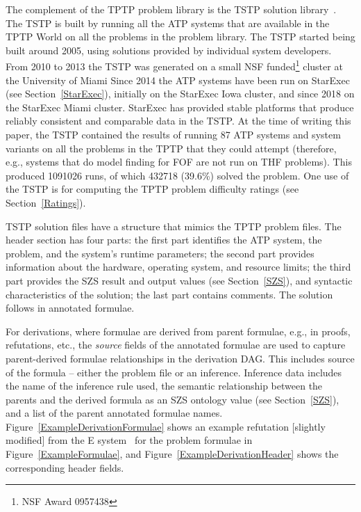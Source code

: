 \documentclass{easychair}
\begin{document}
The complement of the TPTP problem library is the TSTP solution library~\cite{Sut07-CSR,Sut10}.
The TSTP is built by running all the ATP systems that are available in the TPTP World on
all the problems in the problem library.
The TSTP started being built around 2005, using solutions provided by individual system developers.
From 2010 to 2013 the TSTP was generated on a small NSF funded\footnote{%
NSF Award 0957438} cluster at the University of Miami
Since 2014 the ATP systems have been run on StarExec (see Section~\ref{StarExec}), initially on 
the StarExec Iowa cluster, and since 2018 on the StarExec Miami cluster.
StarExec has provided stable platforms that produce reliably consistent and comparable data in 
the TSTP.
At the time of writing this paper, the TSTP contained the results of running 87 ATP systems and 
system variants on all the problems in the TPTP that they could attempt
(therefore, e.g., systems that do model finding for FOF are not run on THF problems).
This produced 1091026 runs, of which 432718 (39.6\%) solved the problem.
One use of the TSTP is for computing the TPTP problem difficulty ratings (see 
Section~\ref{Ratings}).

TSTP solution files have a structure that mimics the TPTP problem files.
The header section has four parts: 
the first part identifies the ATP system, the problem, and the system's runtime parameters; 
the second part provides information about the hardware, operating system, and resource limits; 
the third part provides the SZS result and output values (see Section~\ref{SZS}), and syntactic 
characteristics of the solution; the last part contains comments.
The solution follows in annotated formulae. 

For derivations, where formulae are derived from parent formulae, e.g., in proofs, refutations, 
etc., the {\em source} fields of the annotated formulae are used to capture parent-derived 
formulae relationships in the derivation DAG.
This includes source of the formula -- either the problem file or an inference.
Inference data includes the name of the inference rule used, the semantic relationship between 
the parents and the derived formula as an SZS ontology value (see Section~\ref{SZS}), and a 
list of the parent annotated formulae names.
Figure~\ref{ExampleDerivationFormulae} shows an example refutation [slightly modified] from the 
E system~\cite{SCV19} for the problem formulae in Figure~\ref{ExampleFormulae}, and 
Figure~\ref{ExampleDerivationHeader} shows the corresponding header fields.
\end{document}
